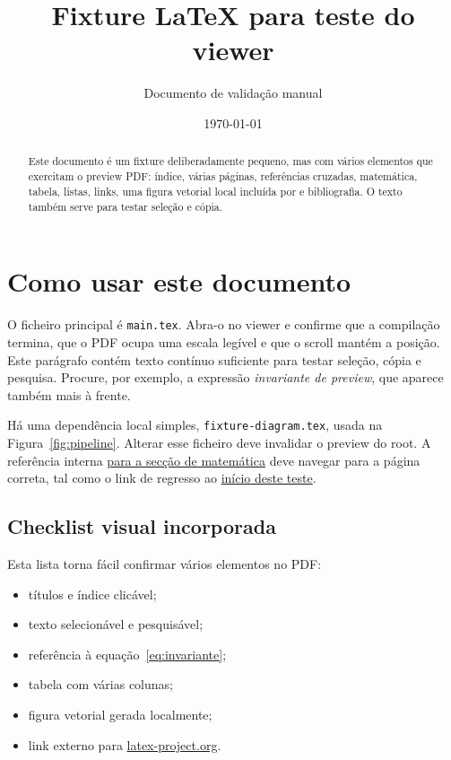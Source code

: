 \documentclass[11pt,a4paper]{article}
\title{Fixture LaTeX para teste do viewer}
\author{Documento de validação manual}
\date{\today}
\begin{document}
\maketitle
\begin{abstract}
Este documento é um fixture deliberadamente pequeno, mas com vários elementos
que exercitam o preview PDF: índice, várias páginas, referências cruzadas,
matemática, tabela, listas, links, uma figura vetorial local incluída por
\verb|| e bibliografia. O texto também serve para testar seleção e cópia.
\end{abstract}

\tableofcontents
\newpage

\section{Como usar este documento}
\label{sec:como-usar}

O ficheiro principal é \texttt{main.tex}. Abra-o no viewer e confirme que a
compilação termina, que o PDF ocupa uma escala legível e que o scroll mantém a
posição. Este parágrafo contém texto contínuo suficiente para testar seleção,
cópia e pesquisa. Procure, por exemplo, a expressão \emph{invariante de
preview}, que aparece também mais à frente.

Há uma dependência local simples, \texttt{fixture-diagram.tex}, usada na
Figura~\ref{fig:pipeline}. Alterar esse ficheiro deve invalidar o preview do
root. A referência interna \hyperref[sec:matematica]{para a secção de
matemática} deve navegar para a página correta, tal como o link de regresso ao
\hyperref[sec:como-usar]{início deste teste}.

\subsection{Checklist visual incorporada}
\label{subsec:checklist}
Esta lista torna fácil confirmar vários elementos no PDF:
\begin{itemize}
  \item títulos e índice clicável;
  \item texto selecionável e pesquisável;
  \item referência à equação~\eqref{eq:invariante};
  \item tabela com várias colunas;
  \item figura vetorial gerada localmente;
  \item link externo para \href{https://www.latex-project.org/}{latex-project.org}.
\end{itemize}
\end{document}
